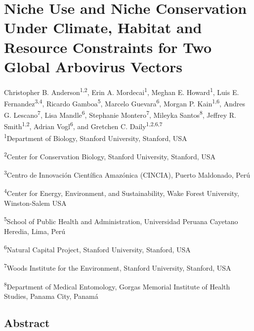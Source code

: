  \chapter[Niche Use and Conservation in \textit{Aedes} Arbovirus Vectors]{Niche Use and Niche Conservation Under Climate, Habitat and Resource Constraints for Two Global Arbovirus Vectors}

Christopher B. Anderson\textsuperscript{1,2},
Erin A. Mordecai\textsuperscript{1},
Meghan E. Howard\textsuperscript{1},
Luis E. Fernandez\textsuperscript{3,4},
Ricardo Gamboa\textsuperscript{5},
Marcelo Guevara\textsuperscript{6},
Morgan P. Kain\textsuperscript{1,6},
Andres G. Lescano\textsuperscript{7},
Lisa Mandle\textsuperscript{6},
Stephanie Montero\textsuperscript{7},
Mileyka Santos\textsuperscript{8},
Jeffrey R. Smith\textsuperscript{1,2},
Adrian Vogl\textsuperscript{6},
and Gretchen C. Daily\textsuperscript{1,2,6,7} \\[6pt]

\noindent\textsuperscript{1}\small{Department of Biology, Stanford University, Stanford, USA}

\noindent\textsuperscript{2}\small{Center for Conservation Biology, Stanford University, Stanford, USA}

\noindent\textsuperscript{3}\small{Centro de Innovación Científica Amazónica (CINCIA), Puerto Maldonado, Perú}

\noindent\textsuperscript{4}\small{Center for Energy, Environment, and Sustainability, Wake Forest University, Winston-Salem USA}

\noindent\textsuperscript{5}\small{School of Public Health and Administration, Universidad Peruana Cayetano Heredia, Lima, Perú}

\noindent\textsuperscript{6}\small{Natural Capital Project, Stanford University, Stanford, USA}

\noindent\textsuperscript{7}\small{Woods Institute for the Environment, Stanford University, Stanford, USA}

\noindent\textsuperscript{8}\small{Department of Medical Entomology, Gorgas Memorial Institute of Health Studies, Panama City, Panamá}

\section{Abstract}


